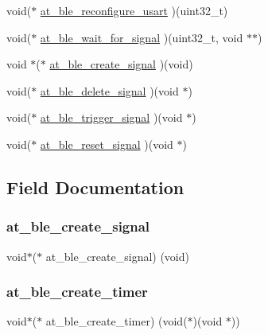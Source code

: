\begin{DoxyCompactItemize}
void($\ast$ \mbox{\hyperlink{structplatform__api__list__tag_a92667f6e1e4c161cdf6b2bddc71eebbd}{at\+\_\+ble\+\_\+reconfigure\+\_\+usart}} )(uint32\+\_\+t)
\item 
void($\ast$ \mbox{\hyperlink{structplatform__api__list__tag_ac7ce812bb94e7ff307732e068b569970}{at\+\_\+ble\+\_\+wait\+\_\+for\+\_\+signal}} )(uint32\+\_\+t, void $\ast$$\ast$)
\item 
void $\ast$($\ast$ \mbox{\hyperlink{structplatform__api__list__tag_a3612df7bd062b0dbca5106f68d89d828}{at\+\_\+ble\+\_\+create\+\_\+signal}} )(void)
\item 
void($\ast$ \mbox{\hyperlink{structplatform__api__list__tag_a467b0a74ad13254e644cdec6c42c42fe}{at\+\_\+ble\+\_\+delete\+\_\+signal}} )(void $\ast$)
\item 
void($\ast$ \mbox{\hyperlink{structplatform__api__list__tag_a97900424663e3a98d1cbaf7b899d2bf8}{at\+\_\+ble\+\_\+trigger\+\_\+signal}} )(void $\ast$)
\item 
void($\ast$ \mbox{\hyperlink{structplatform__api__list__tag_a93903f6ff0390db2c603c25008b6b2b4}{at\+\_\+ble\+\_\+reset\+\_\+signal}} )(void $\ast$)
\end{DoxyCompactItemize}


\subsection{Field Documentation}
\mbox{\label{structplatform__api__list__tag_a3612df7bd062b0dbca5106f68d89d828}} 
\subsubsection{\texorpdfstring{at\_ble\_create\_signal}{at\_ble\_create\_signal}}
{\footnotesize\ttfamily void$\ast$($\ast$ at\+\_\+ble\+\_\+create\+\_\+signal) (void)}

\mbox{\label{structplatform__api__list__tag_a8f8a8e7829d19ccdb3dce134d8140a48}} 
\subsubsection{\texorpdfstring{at\_ble\_create\_timer}{at\_ble\_create\_timer}}
{\footnotesize\ttfamily void$\ast$($\ast$ at\+\_\+ble\+\_\+create\+\_\+timer) (void($\ast$)(void $\ast$))}

